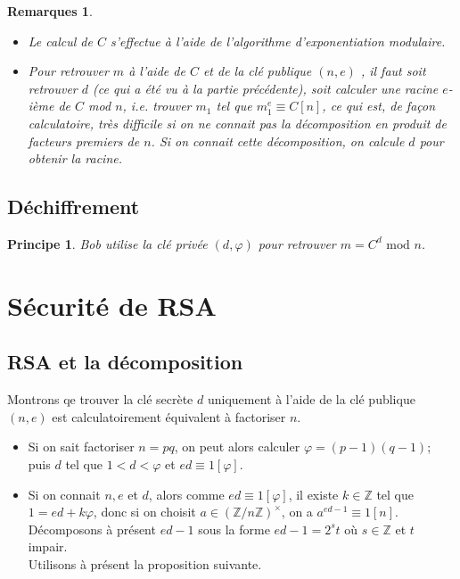 \documentclass[10pt,a4paper]{report}
\newtheorem*{rems}{Remarques}
\newtheorem*{prin}{Principe}
\begin{document}
\begin{rems}\
\begin{itemize}
\item[•] Le calcul de $C$ s'effectue à l'aide de l'algorithme d'exponentiation modulaire.
\item[•] Pour retrouver $m$ à l'aide de $C$ et de la clé publique $(n,e)$ , il faut soit retrouver $d$ (ce qui a été vu à la partie précédente), soit calculer une racine $e$-ième de $C$ mod $n$, i.e. trouver $m_1$ tel que $m_1^e \equiv C [n]$, ce qui est, de façon calculatoire, très difficile si on ne connait pas la décomposition en produit de facteurs premiers de $n$. Si on connait cette décomposition, on calcule $d$ pour obtenir la racine. 
\end{itemize}
\end{rems}

\subsection{Déchiffrement}

\begin{prin}
Bob utilise la clé privée $(d,\varphi)$ pour retrouver $m=C^d \text{ mod } n$.
\end{prin}

\section{Sécurité de RSA}

\subsection{RSA et la décomposition}

Montrons qe trouver la clé secrète $d$ uniquement à l'aide de la clé publique $(n,e)$ est calculatoirement équivalent à factoriser $n$.

\begin{itemize}
\item[•] Si on sait factoriser $n=pq$, on peut alors calculer $\varphi=(p-1)(q-1)$; puis $d$ tel que $1<d<\varphi$ et $ed \equiv 1 [\varphi]$.
\item[•] Si on connait $n,e$ et $d$, alors comme $ed \equiv 1 [\varphi]$, il existe $k \in \mathbb{Z}$ tel que $1=ed + k \varphi$, donc si on choisit $a \in (\mathbb{Z}/n\mathbb{Z})^{\times}  $, on a $a^{ed-1}\equiv 1 [n]$. Décomposons à présent $ed-1$ sous la forme $ed-1=2^s t$ où $s \in \mathbb{Z}$ et $t$ impair.\\
Utilisons à présent la proposition suivante. 
\end{itemize}
\end{document}
